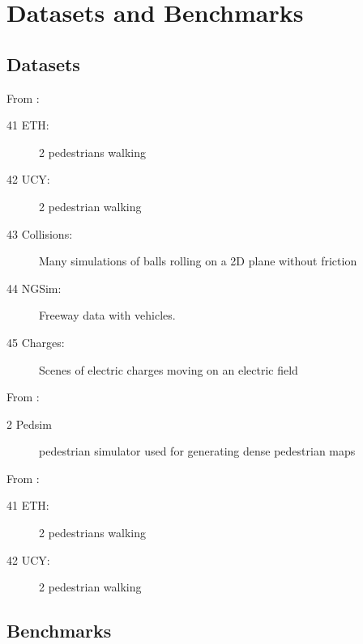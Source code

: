 \section{Datasets and Benchmarks}\label{sec: datasets and benchmarks}

\subsection{Datasets}

From \cite{xu2021tra2tra}: 
\begin{description}
	\item[41 ETH:] 2 pedestrians walking
	\item[42 UCY:] 2 pedestrian walking
	\item[43 Collisions:] Many simulations of balls rolling on a 2D plane without friction 
	\item[44 NGSim:] Freeway data with vehicles.
	\item[45 Charges:] Scenes of electric charges moving on an electric field
\end{description}

From \cite{kiss2021probabilistic}:
\begin{description}
	\item[2 Pedsim] pedestrian simulator used for generating dense pedestrian maps
\end{description}

From \cite{ivanovic2019trajectron}:
\begin{description}
	\item[41 ETH:] 2 pedestrians walking
	\item[42 UCY:] 2 pedestrian walking
\end{description}


\subsection{Benchmarks}